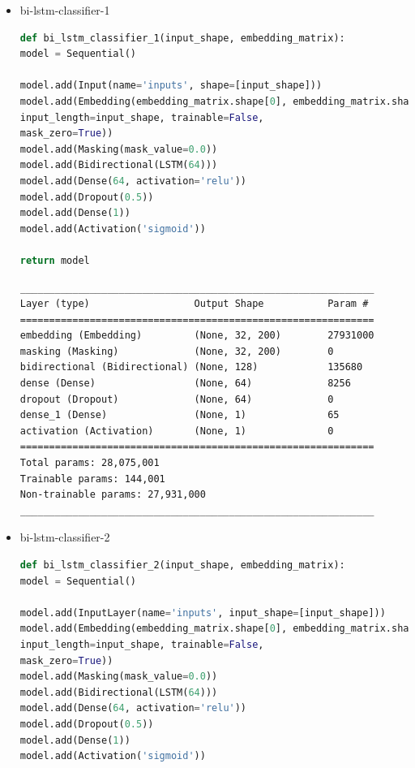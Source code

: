 \documentclass{article}
\begin{document}
\begin{itemize}
\item bi-lstm-classifier-1

\begin{lstlisting}[language=Python, caption=Дефиниция на bi-lstm-classifier-1.]
def bi_lstm_classifier_1(input_shape, embedding_matrix):
model = Sequential()

model.add(Input(name='inputs', shape=[input_shape]))
model.add(Embedding(embedding_matrix.shape[0], embedding_matrix.shape[1], weights=[embedding_matrix],
input_length=input_shape, trainable=False,
mask_zero=True))
model.add(Masking(mask_value=0.0))
model.add(Bidirectional(LSTM(64)))
model.add(Dense(64, activation='relu'))
model.add(Dropout(0.5))
model.add(Dense(1))
model.add(Activation('sigmoid'))

return model
\end{lstlisting}

\begin{lstlisting}[numbers=none, caption=Обобщение на bi-lstm-classifier-1.]
_____________________________________________________________
Layer (type)                  Output Shape           Param #
=============================================================
embedding (Embedding)         (None, 32, 200)        27931000
masking (Masking)             (None, 32, 200)        0
bidirectional (Bidirectional) (None, 128)            135680
dense (Dense)                 (None, 64)             8256
dropout (Dropout)             (None, 64)             0
dense_1 (Dense)               (None, 1)              65
activation (Activation)       (None, 1)              0
=============================================================
Total params: 28,075,001
Trainable params: 144,001
Non-trainable params: 27,931,000
_____________________________________________________________
\end{lstlisting}

\item bi-lstm-classifier-2

\begin{lstlisting}[language=Python, caption=Дефиниция на bi-lstm-classifier-2.]
def bi_lstm_classifier_2(input_shape, embedding_matrix):
model = Sequential()

model.add(InputLayer(name='inputs', input_shape=[input_shape]))
model.add(Embedding(embedding_matrix.shape[0], embedding_matrix.shape[1], weights=[embedding_matrix],
input_length=input_shape, trainable=False,
mask_zero=True))
model.add(Masking(mask_value=0.0))
model.add(Bidirectional(LSTM(64)))
model.add(Dense(64, activation='relu'))
model.add(Dropout(0.5))
model.add(Dense(1))
model.add(Activation('sigmoid'))


\end{lstlisting}
\end{itemize}
\end{document}
